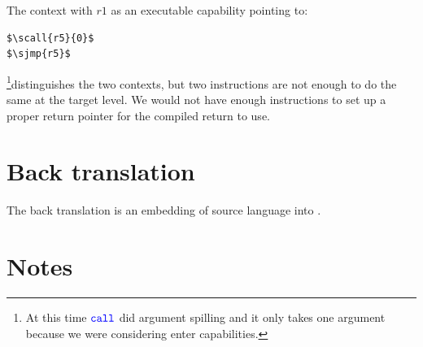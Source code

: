 \documentclass[a4paper]{article}
\newcommand{\sourcecolor}[1]{\color{blue}}
\newcommand{\src}[1]{{\sourcecolor{} #1}}
\newcommand{\zinstr}[1]{\texttt{#1}}
\newcommand{\oneinstr}[2]{
  \ifthenelse{\equal{#2}{}}
  {\zinstr{#1}}
  {\zinstr{#1} \; #2}
}
\newcommand{\twoinstr}[3]{
  \ifthenelse{\equal{#2#3}{}}
  {\zinstr{#1}}
  {\zinstr{#1} \; #2 \; #3}
}
\newcommand{\sjmp}[1]{\oneinstr{\src{jmp}}{#1}}
\newcommand{\scall}[2]{\twoinstr{\src{call}}{#1}{#2}}
\begin{document}
The context with $r1$ as an executable capability pointing to:
\begin{lstlisting}[basicstyle=\sourcecolor{}\ttfamily] 
$\scall{r5}{0}$
$\sjmp{r5}$
\end{lstlisting}
\footnote{At this time $\scall{}{}$ did argument spilling and it only takes one argument because we were considering enter capabilities.}distinguishes the two contexts, but two instructions are not enough to do the same at the target level. We would not have enough instructions to set up a proper return pointer for the compiled return to use.

\clearpage
\section{Back translation}
The back translation is an embedding of source language into .

\section{Notes}
\end{document}
